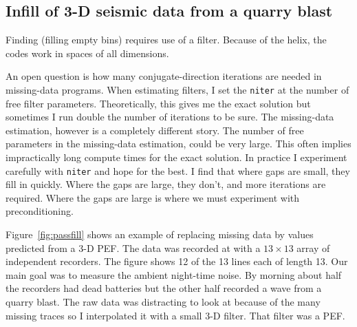 \subsection{Infill of 3-D seismic data from a quarry blast}
Finding  (filling empty bins) requires use of a filter.
Because of the helix, the codes work in spaces of all dimensions.
\par
An open question is how many conjugate-direction iterations
are needed in missing-data programs.
When estimating filters, I set the  {\tt niter}
at the number of free filter parameters.
Theoretically, this gives me the exact solution
but sometimes I run double the number of iterations to be sure.
The missing-data estimation, however is a completely different story.
The number of free parameters in the missing-data estimation,
could be very large.
This often implies impractically long compute times for the exact solution.
In practice I experiment carefully with
\texttt{niter} and hope for the best.
I find that where gaps are small, they fill in quickly.
Where the gaps are large, they don't, and more iterations are required.
Where the gaps are large is where we must experiment with preconditioning.
\par
{}
Figure~\ref{fig:passfill} shows an example of
replacing missing data by values predicted from a 3-D PEF.
The data was recorded at 
with a $13\times 13$ array of independent recorders.
The figure shows 12 of the 13 lines each of length 13.
Our main goal was to measure the ambient night-time noise.
By morning about half the recorders had dead batteries
but the other half recorded a wave from a quarry blast.
The raw data was distracting to look at
because of the many missing traces
so I interpolated it with a small 3-D filter.
That filter was a PEF.

